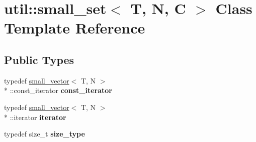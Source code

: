 \hypertarget{classutil_1_1small__set}{\section{util\+:\+:small\+\_\+set$<$ T, N, C $>$ Class Template Reference}
\label{classutil_1_1small__set}
}
\subsection*{Public Types}
\begin{DoxyCompactItemize}
\item 
\hypertarget{classutil_1_1small__set_a6963d7e6ac4a626edf36efd57ebd3b0a}{typedef \hyperlink{classutil_1_1small__vector}{small\+\_\+vector}$<$ T, N $>$\\*
\+::const\+\_\+iterator {\bfseries const\+\_\+iterator}}\label{classutil_1_1small__set_a6963d7e6ac4a626edf36efd57ebd3b0a}

\item 
\hypertarget{classutil_1_1small__set_aa8139b15b229a024c712fddb510c3522}{typedef \hyperlink{classutil_1_1small__vector}{small\+\_\+vector}$<$ T, N $>$\\*
\+::iterator {\bfseries iterator}}\label{classutil_1_1small__set_aa8139b15b229a024c712fddb510c3522}

\item 
\hypertarget{classutil_1_1small__set_a68e3c2c0d14a047680878fb3bdf1603e}{typedef size\+\_\+t {\bfseries size\+\_\+type}}\label{classutil_1_1small__set_a68e3c2c0d14a047680878fb3bdf1603e}

\end{DoxyCompactItemize}
